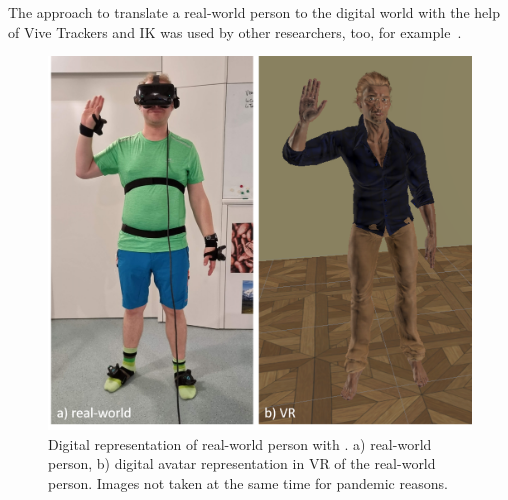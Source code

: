 The approach to translate a real-world person to the digital world with the help of Vive Trackers and IK was used by other researchers, too, for example~\cite{samesetup,perspectivematters}. 

\begin{figure}[H]
	\centering
	\includegraphics[width=\textwidth]{figures/selfPerception.png}	
	\caption[Digital representation of real-world person.]{Digital representation of real-world person with \exgo. a) real-world person, b) digital avatar representation in VR of the real-world person. Images not taken at the same time for pandemic reasons.}
	\label{fig:selfPerception}
\end{figure}

